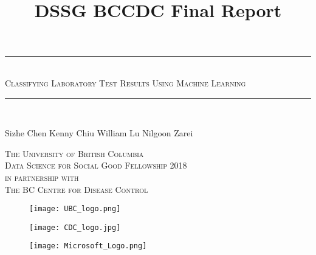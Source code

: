 \documentclass[11pt]{article}
\title{DSSG BCCDC Final Report}
\newcommand{\adjustimg}{%
  \checkoddpage%
  \ifoddpage\hspace*{\dimexpr\evensidemargin-\oddsidemargin}\else\hspace*{-\dimexpr\evensidemargin-\oddsidemargin}\fi%
}
\newcommand{\centerimg}[2][width=\textwidth]{%
  \makebox[\textwidth]{\adjustimg\texttt{[image: \#2]}}%
}
\begin{document}
\begin{titlepage}
    \centering
    \rule{\linewidth}{0.5 mm} \\[0.6 cm]
    \textsc{\Large Classifying Laboratory Test Results Using Machine Learning}\\[0.4cm]
    \rule{\linewidth}{0.5 mm} \\[0.5 cm]
    
        \begin{minipage}{\textwidth}
        \centering
        Sizhe Chen \hspace*{1cm} Kenny Chiu \hspace*{1cm} William Lu \hspace*{1cm} Nilgoon Zarei
    \end{minipage}
    
    \vspace*{1cm}
    \mbox{}\par\noindent\centerimg[width=\textwidth,height=170pt]{title_pic}
    
    \vspace*{1cm}
    
    \textsc{\large The University of British Columbia}\\
    \vspace{0.2cm}
    \textsc{\large Data Science for Social Good Fellowship 2018}\\[1cm]
   
    \textsc{in partnership with}\\
    \vspace{0.2cm}
    \textsc{\large The BC Centre for Disease Control}\\
    
    \vspace{4.2cm}
    
    \begin{figure}[h]
        \begin{minipage}{0.36\textwidth}
        \hspace*{5.5cm}\texttt{[image: UBC\_logo.png]} 
       
        \end{minipage}
        \begin{minipage}{0.22\textwidth}
        \hspace*{5.5cm}\texttt{[image: CDC\_logo.jpg]} 
       
        \end{minipage}
        \begin{minipage}{0.09\textwidth}
        \vspace{-0.1cm}\hspace*{5.5cm}\texttt{[image: Microsoft\_Logo.png]}
       
        \end{minipage}
    \end{figure}

\end{titlepage}
\end{document}
